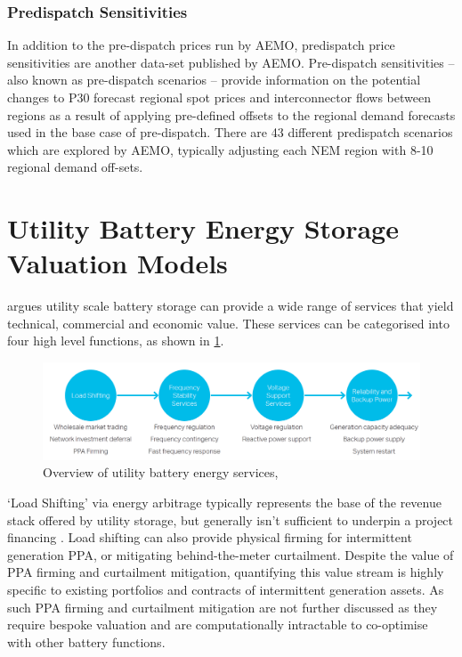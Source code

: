 \subsubsection{Predispatch Sensitivities}
\label{sec:background_predispatch_sensitivites}
In  addition  to  the  pre-dispatch  prices  run  by  AEMO,  predispatch  price  sensitivities are another data-set published by AEMO. Pre-dispatch sensitivities – also known as  pre-dispatch  scenarios  –  provide  information  on  the  potential  changes  to P30 forecast  regional  spot  prices  and  interconnector  flows  between  regions  as  a  result  of applying pre-defined offsets to the regional demand forecasts used in the base case of pre-dispatch. There are 43 different predispatch scenarios which are explored by AEMO, typically adjusting each NEM region with 8-10 regional demand off-sets. 
\section{ Utility Battery Energy Storage Valuation Models }
\textcite{AECOM} argues utility scale battery storage can provide a wide range of services that yield technical, commercial and economic value. These services can be categorised into four high level functions, as shown in \ref{fig:bess_services}. 
\begin{figure}[H]
    \centering
    \includegraphics[width=\textwidth]{Pictures/Chapter2/bess_services.png}
    \caption{Overview of utility battery energy services, \parencite{AECOM}}
    \label{fig:bess_services}
\end{figure}
`Load Shifting' via energy arbitrage typically represents the base of the revenue stack offered by utility storage, but generally isn't sufficient to underpin a project financing \parencite{Mackenzie:2018}. Load shifting can also provide physical firming for intermittent generation PPA, or mitigating behind-the-meter curtailment.  Despite the value of PPA firming and curtailment mitigation, quantifying this value stream is highly specific to existing portfolios and contracts of intermittent generation assets. As such PPA firming and curtailment mitigation are not further discussed as they require bespoke valuation and are computationally intractable to co-optimise with other battery functions. 

